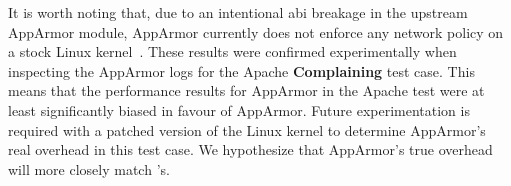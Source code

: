 It is worth noting that, due to an intentional \gls{abi} breakage in the upstream AppArmor
module, AppArmor currently does not enforce any network policy on a stock Linux
kernel~\cite{apparmor_net1, apparmor_net2}. These results were confirmed experimentally
when inspecting the AppArmor logs for the Apache \textbf{Complaining}  test case. This
means that the performance results for AppArmor in the Apache test were at least
significantly biased in favour of AppArmor.  Future experimentation is required with
a patched version of the Linux kernel to determine AppArmor's real overhead in this test
case. We hypothesize that AppArmor's true overhead will more closely match
\bpfcontain{}'s.



